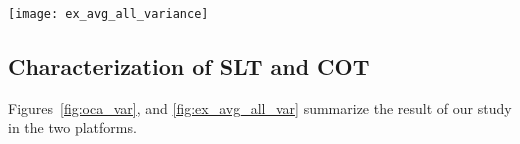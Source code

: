 %

\begin{figure*}[tb]
  \centering
    \texttt{[image: ex\_avg\_all\_variance]}
\caption{Mean and standard deviation of execution time on (a) Haswell and (b)
Broadwell across all explored tile sizes. Variance is high for both COT and
SLT on both machines. Therefore, tile size exploration/tuning is needed for
speed.}
	\label{fig:ex_avg_all_var}
\end{figure*}





\subsection{Characterization of SLT and COT}
Figures~\ref{fig:oca_var}, and \ref{fig:ex_avg_all_var} summarize the result
of our study in the two platforms.

